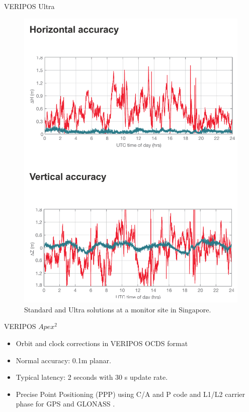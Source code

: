 \documentclass[12pt]{beamer}
\begin{document}
\begin{frame}[plain]{VERIPOS Ultra}
	
	\begin{figure}
		
		\includegraphics[height=0.8\textheight]{pic/Ultra.png}
		\caption{Standard and Ultra solutions at a monitor site in Singapore.}
	\end{figure}
	
\end{frame}

\begin{frame}{VERIPOS $Apex^2$}
	
	\begin{itemize}	
		\item Orbit and clock corrections in VERIPOS OCDS format
		\item Normal accuracy: 0.1m planar. 
		\item Typical latency: 2 seconds with 30 s update rate.%
		\item Precise Point Positioning (PPP) using C/A and P code and L1/L2 carrier phase for GPS and GLONASS .
	\end{itemize}	


	
\end{frame}	
\end{document}

